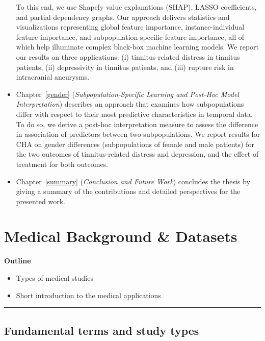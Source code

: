 \documentclass[
  oneside]{book}
\providecommand{\tightlist}{%
  \setlength{\itemsep}{0pt}\setlength{\parskip}{0pt}}
\begin{document}
\begin{itemize}
  To this end, we use Shapely value explanations (SHAP), LASSO coefficients, and partial dependency graphs.
  Our approach delivers statistics and visualizations representing global feature importance, instance-individual feature importance, and subpopulation-specific feature importance, all of which help illuminate complex black-box machine learning models.
  We report our results on three applications: (i) tinnitus-related distress in tinnitus patients, (ii) depressivity in tinnitus patients, and (iii) rupture risk in intracranial aneurysms.
\item
  Chapter~\ref{gender} (\emph{Subpopulation-Specific Learning and Post-Hoc Model Interpretation}) describes an approach that examines how subpopulations differ with respect to their most predictive characteristics in temporal data. To do so, we derive a post-hoc interpretation measure to assess the difference in association of predictors between two subpopulations. We report results for CHA on gender differences (subpopulations of female and male patients) for the two outcomes of tinnitus-related distress and depression, and the effect of treatment for both outcomes.
\item
  Chapter~\ref{summary} (\emph{Conclusion and Future Work}) concludes the thesis by giving a summary of the contributions and detailed perspectives for the presented work.
\end{itemize}

\hypertarget{background}{%
\chapter{Medical Background \& Datasets}\label{background}}

\textbf{Outline}

\begin{itemize}
\tightlist
\item
  Types of medical studies
\item
  Short introduction to the medical applications
\end{itemize}

\begin{center}\rule{0.5\linewidth}{0.5pt}\end{center}

\hypertarget{fundamental-terms-and-study-types}{%
\section{Fundamental terms and study types}\label{fundamental-terms-and-study-types}}
\end{document}
